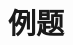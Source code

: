 \documentclass[notheorems,compress,mathserif,table]{beamer}
\newtheorem{example}{例题}
\begin{document}
\section{例题}
%
%
%
%
%
%
%
%
%
%
%
%
%
%
\end{document}
